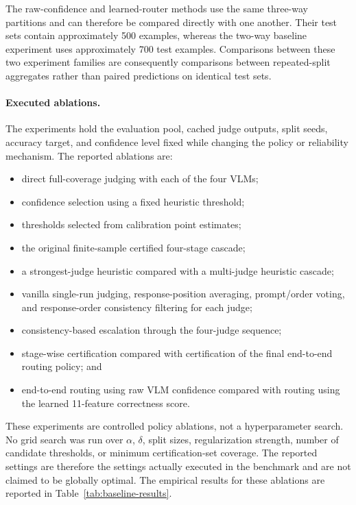 \documentclass[11pt]{article}
\begin{document}
The raw-confidence and learned-router methods use the same three-way
partitions and can therefore be compared directly with one another. Their
test sets contain approximately 500 examples, whereas the two-way baseline
experiment uses approximately 700 test examples. Comparisons between these
two experiment families are consequently comparisons between repeated-split
aggregates rather than paired predictions on identical test sets.

\paragraph{Executed ablations.}
The experiments hold the evaluation pool, cached judge outputs, split seeds,
accuracy target, and confidence level fixed while changing the policy or
reliability mechanism. The reported ablations are:

\begin{itemize}
    \item direct full-coverage judging with each of the four VLMs;
    \item confidence selection using a fixed heuristic threshold;
    \item thresholds selected from calibration point estimates;
    \item the original finite-sample certified four-stage cascade;
    \item a strongest-judge heuristic compared with a multi-judge heuristic
          cascade;
    \item vanilla single-run judging, response-position averaging,
          prompt/order voting, and response-order consistency filtering for
          each judge;
    \item consistency-based escalation through the four-judge sequence;
    \item stage-wise certification compared with certification of the final
          end-to-end routing policy; and
    \item end-to-end routing using raw VLM confidence compared with routing
          using the learned 11-feature correctness score.
\end{itemize}

These experiments are controlled policy ablations, not a hyperparameter
search. No grid search was run over $\alpha$, $\delta$, split sizes,
regularization strength, number of candidate thresholds, or minimum
certification-set coverage. The reported settings are therefore the settings
actually executed in the benchmark and are not claimed to be globally
optimal. The empirical results for these ablations are reported in Table~\ref{tab:baseline-results}.
\end{document}
